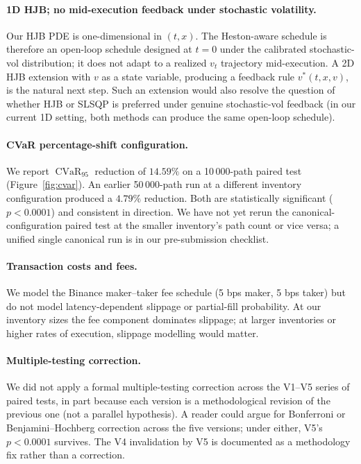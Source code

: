 \documentclass[11pt,letterpaper]{article}
\newcommand{\CVaR}{\operatorname{CVaR}}
\begin{document}
\paragraph{1D HJB; no mid-execution feedback under stochastic volatility.} Our HJB PDE is one-dimensional in \((t,x)\). The Heston-aware schedule is therefore an open-loop schedule designed at \(t=0\) under the calibrated stochastic-vol distribution; it does not adapt to a realized \(v_t\) trajectory mid-execution. A 2D HJB extension with \(v\) as a state variable, producing a feedback rule \(v^{*}(t,x,v)\), is the natural next step. Such an extension would also resolve the question of whether HJB or SLSQP is preferred under genuine stochastic-vol feedback (in our current 1D setting, both methods can produce the same open-loop schedule).

\paragraph{CVaR percentage-shift configuration.} We report \(\CVaR_{95}\) reduction of \(14.59\%\) on a 10\,000-path paired test (Figure~\ref{fig:cvar}). An earlier 50\,000-path run at a different inventory configuration produced a \(4.79\%\) reduction. Both are statistically significant (\(p<0.0001\)) and consistent in direction. We have not yet rerun the canonical-configuration paired test at the smaller inventory's path count or vice versa; a unified single canonical run is in our pre-submission checklist.

\paragraph{Transaction costs and fees.} We model the Binance maker--taker fee schedule (5 bps maker, 5 bps taker) but do not model latency-dependent slippage or partial-fill probability. At our inventory sizes the fee component dominates slippage; at larger inventories or higher rates of execution, slippage modelling would matter.

\paragraph{Multiple-testing correction.} We did not apply a formal multiple-testing correction across the V1--V5 series of paired tests, in part because each version is a methodological revision of the previous one (not a parallel hypothesis). A reader could argue for Bonferroni or Benjamini--Hochberg correction across the five versions; under either, V5's \(p<0.0001\) survives. The V4 invalidation by V5 is documented as a methodology fix rather than a correction.
\end{document}
